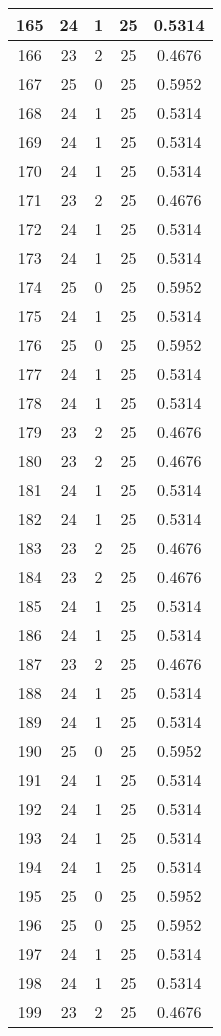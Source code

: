 \documentclass[letterpaper, 12pt]{article}
\begin{document}
\begin{longtable}{|c|c|c|c|c|}
\hline
165 & 24 & 1 & 25 & 0.5314 \\
\hline
166 & 23 & 2 & 25 & 0.4676 \\
\hline
167 & 25 & 0 & 25 & 0.5952 \\
\hline
168 & 24 & 1 & 25 & 0.5314 \\
\hline
169 & 24 & 1 & 25 & 0.5314 \\
\hline
170 & 24 & 1 & 25 & 0.5314 \\
\hline
171 & 23 & 2 & 25 & 0.4676 \\
\hline
172 & 24 & 1 & 25 & 0.5314 \\
\hline
173 & 24 & 1 & 25 & 0.5314 \\
\hline
174 & 25 & 0 & 25 & 0.5952 \\
\hline
175 & 24 & 1 & 25 & 0.5314 \\
\hline
176 & 25 & 0 & 25 & 0.5952 \\
\hline
177 & 24 & 1 & 25 & 0.5314 \\
\hline
178 & 24 & 1 & 25 & 0.5314 \\
\hline
179 & 23 & 2 & 25 & 0.4676 \\
\hline
180 & 23 & 2 & 25 & 0.4676 \\
\hline
181 & 24 & 1 & 25 & 0.5314 \\
\hline
182 & 24 & 1 & 25 & 0.5314 \\
\hline
183 & 23 & 2 & 25 & 0.4676 \\
\hline
184 & 23 & 2 & 25 & 0.4676 \\
\hline
185 & 24 & 1 & 25 & 0.5314 \\
\hline
186 & 24 & 1 & 25 & 0.5314 \\
\hline
187 & 23 & 2 & 25 & 0.4676 \\
\hline
188 & 24 & 1 & 25 & 0.5314 \\
\hline
189 & 24 & 1 & 25 & 0.5314 \\
\hline
190 & 25 & 0 & 25 & 0.5952 \\
\hline
191 & 24 & 1 & 25 & 0.5314 \\
\hline
192 & 24 & 1 & 25 & 0.5314 \\
\hline
193 & 24 & 1 & 25 & 0.5314 \\
\hline
194 & 24 & 1 & 25 & 0.5314 \\
\hline
195 & 25 & 0 & 25 & 0.5952 \\
\hline
196 & 25 & 0 & 25 & 0.5952 \\
\hline
197 & 24 & 1 & 25 & 0.5314 \\
\hline
198 & 24 & 1 & 25 & 0.5314 \\
\hline
199 & 23 & 2 & 25 & 0.4676 \\
\hline
\end{longtable}
\end{document}

